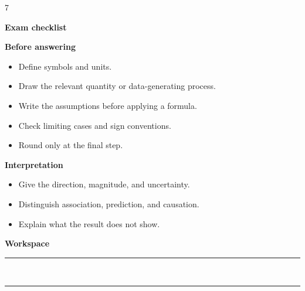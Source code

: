 \documentclass[a4paper,landscape]{article}
\newcommand{\hlhighlight}[1]{\par\smallskip\noindent\colorbox{banner}{\strut\textbf{#1}}\par}
\newcommand{\sectitle}[1]{\par\smallskip\noindent\textcolor{section}{\textbf{#1}}\par}
\begin{document}
\begin{multicols}{7}
\hlhighlight{Exam checklist}
\sectitle{Before answering}
\begin{itemize}
\item Define symbols and units.
\item Draw the relevant quantity or data-generating process.
\item Write the assumptions before applying a formula.
\item Check limiting cases and sign conventions.
\item Round only at the final step.
\end{itemize}
\sectitle{Interpretation}
\begin{itemize}
\item Give the direction, magnitude, and uncertainty.
\item Distinguish association, prediction, and causation.
\item Explain what the result does not show.
\end{itemize}
\sectitle{Workspace}
\vspace{13mm}
\noindent\rule{\linewidth}{0.2pt}\\
\vspace{13mm}
\noindent\rule{\linewidth}{0.2pt}

\end{multicols}
\end{document}
